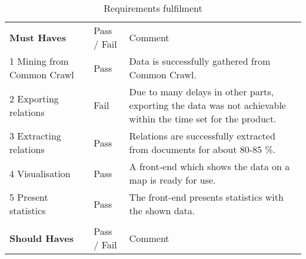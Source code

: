 \begin{table}[H]
\centering
\caption{Requirements fulfilment}
\label{requirements_pass/fail}
\begin{tabular}{ll m{8cm}}
\textbf{Must Haves}                     & Pass / Fail & Comment                                                                                                                                                                                                                           \\
1 Mining from Common Crawl     & Pass        & Data is successfully gathered from Common Crawl.                                                                                                                                                                                       \\ \hline
2 Exporting relations          & Fail        & Due to many delays in other parts, exporting the data was not achievable within the time set for the product.                                                                                                                         \\ \hline
3 Extracting relations         & Pass        & Relations are successfully extracted from documents for about 80-85 \%.                                                                                                                                                            \\ \hline
4 Visualisation                & Pass        & A front-end which shows the data on a map is ready for use.                                                                                                                                                                           \\ \hline
5 Present statistics           & Pass        & The front-end presents statistics with the shown data.                                                                                                                                                                                \\ 
                               &             &                                                                                                                                                                                                                                       \\
\textbf{Should Haves}                   & Pass / Fail & Comment                                                                                                                                                                                                                               \\

\end{tabular}
\end{table}
